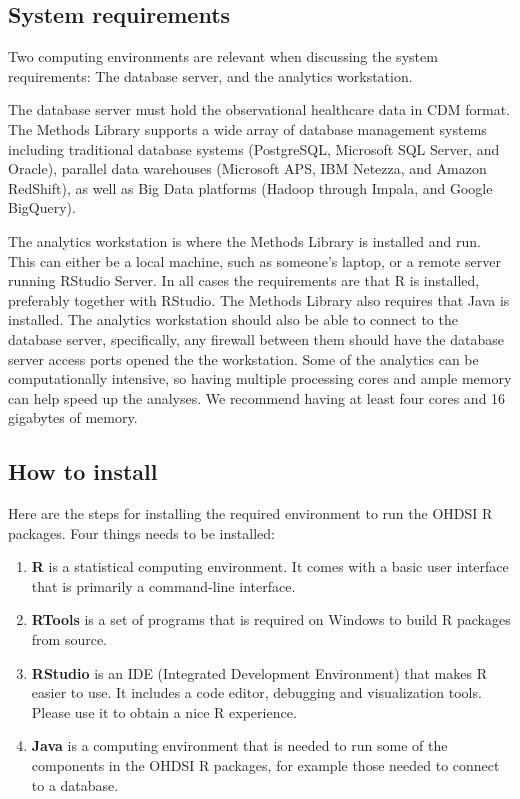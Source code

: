 \documentclass[11pt]{book}
\providecommand{\tightlist}{%
  \setlength{\itemsep}{0pt}\setlength{\parskip}{0pt}}
\theoremstyle{definition}
\theoremstyle{definition}
\theoremstyle{definition}
\theoremstyle{remark}
\begin{document}
\hypertarget{system-requirements}{%
\subsection{System requirements}\label{system-requirements}}

Two computing environments are relevant when discussing the system requirements: The database server, and the analytics workstation.

The database server must hold the observational healthcare data in CDM format. The Methods Library supports a wide array of database management systems including traditional database systems (PostgreSQL, Microsoft SQL Server, and Oracle), parallel data warehouses (Microsoft APS, IBM Netezza, and Amazon RedShift), as well as Big Data platforms (Hadoop through Impala, and Google BigQuery).

The analytics workstation is where the Methods Library is installed and run. This can either be a local machine, such as someone's laptop, or a remote server running RStudio Server. In all cases the requirements are that R is installed, preferably together with RStudio. The Methods Library also requires that Java is installed. The analytics workstation should also be able to connect to the database server, specifically, any firewall between them should have the database server access ports opened the the workstation. Some of the analytics can be computationally intensive, so having multiple processing cores and ample memory can help speed up the analyses. We recommend having at least four cores and 16 gigabytes of memory.

\hypertarget{installR}{%
\subsection{How to install}\label{installR}}

Here are the steps for installing the required environment to run the OHDSI R packages. Four things needs to be installed:

\begin{enumerate}
\def\labelenumi{\arabic{enumi}.}
\tightlist
\item
  \textbf{R} is a statistical computing environment. It comes with a basic user interface that is primarily a command-line interface.
\item
  \textbf{RTools} is a set of programs that is required on Windows to build R packages from source.
\item
  \textbf{RStudio} is an IDE (Integrated Development Environment) that makes R easier to use. It includes a code editor, debugging and visualization tools. Please use it to obtain a nice R experience.
\item
  \textbf{Java} is a computing environment that is needed to run some of the components in the OHDSI R packages, for example those needed to connect to a database.
\end{enumerate}
\end{document}
